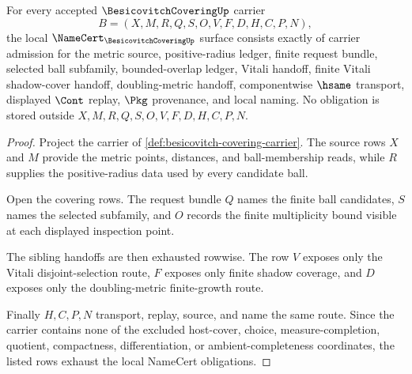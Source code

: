 \begin{theorem}
\label{thm:besicovitch-covering-namecert-obligations}
For every accepted $\BesicovitchCoveringUp$ carrier
$$
B=(X,M,R,Q,S,O,V,F,D,H,C,P,N),
$$
the local $\NameCert_{\BesicovitchCoveringUp}$ surface consists exactly of carrier admission for the metric source, positive-radius ledger, finite request bundle, selected ball subfamily, bounded-overlap ledger, Vitali handoff, finite Vitali shadow-cover handoff, doubling-metric handoff, componentwise $\hsame$ transport, displayed $\Cont$ replay, $\Pkg$ provenance, and local naming. No obligation is stored outside $X,M,R,Q,S,O,V,F,D,H,C,P,N$.
\end{theorem}
\begin{proof}
Project the carrier of \autoref{def:besicovitch-covering-carrier}. The source rows $X$ and $M$ provide the metric points, distances, and ball-membership reads, while $R$ supplies the positive-radius data used by every candidate ball.

Open the covering rows. The request bundle $Q$ names the finite ball candidates, $S$ names the selected subfamily, and $O$ records the finite multiplicity bound visible at each displayed inspection point.

The sibling handoffs are then exhausted rowwise. The row $V$ exposes only the Vitali disjoint-selection route, $F$ exposes only finite shadow coverage, and $D$ exposes only the doubling-metric finite-growth route.

Finally $H,C,P,N$ transport, replay, source, and name the same route. Since the carrier contains none of the excluded host-cover, choice, measure-completion, quotient, compactness, differentiation, or ambient-completeness coordinates, the listed rows exhaust the local NameCert obligations.
\end{proof}

